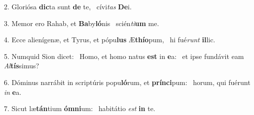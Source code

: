 2. Gloriósa \textbf{dic}ta sunt \textbf{de} te, \ast\  cívi\textit{tas} \textbf{De}i.\

3. Memor ero Rahab, et \textbf{Ba}by\textbf{ló}nis \ast\  scién\textit{ti}\textbf{um} me.\

4. Ecce alienígenæ, et Tyrus, et pópu\textbf{lus} Æ\textbf{thí}\textbf{o}pum, \ast\  hi fué\textit{runt} \textbf{il}lic.\

5. Numquid Sion dicet: \dag\  Homo, et homo natus \textbf{est} in \textbf{e}a: \ast\  et ipse fundávit eam \textit{Al}\textbf{tís}simus?\

6. Dóminus narrábit in scriptúris popu\textbf{ló}rum, et \textbf{prín}\textbf{ci}pum: \ast\  horum, qui fuérunt \textit{in} \textbf{e}a.\

7. Sicut læ\textbf{tán}tium \textbf{óm}\textbf{ni}um: \ast\  habitátio \textit{est} \textbf{in} te.\

